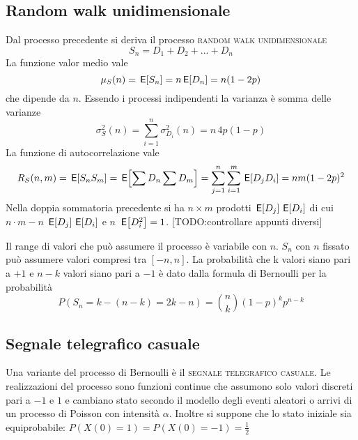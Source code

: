 \subsection{Random walk unidimensionale}
Dal processo precedente si deriva il processo \textsc{random walk unidimensionale}
\begin{equation}S_n=D_1+D_2+\dots+D_n\end{equation}
La funzione valor medio vale
\begin{equation}\mu_S(n)=\,{\operatorname{\mathsf{E}}}\!\left[{S_n}\right]=n\,{\operatorname{\mathsf{E}}}\!\left[{D_n}\right]=n(1-2p)\end{equation}
che dipende da $n$. Essendo i processi indipendenti la varianza è somma delle varianze
\begin{equation}\sigma^2_S(n)=\sum_{i=1}^{n}\sigma^2_{D_i}(n)=n\,4p(1-p)\end{equation}
La funzione di autocorrelazione vale
\begin{equation}R_S(n,m)=\,{\operatorname{\mathsf{E}}}\!\left[{S_n S_m}\right]=\,{\operatorname{\mathsf{E}}}\!\left[{\sum D_n \sum D_m}\right]=\sum_{j=1}^{n}\sum_{i=1}^{m}\,{\operatorname{\mathsf{E}}}\!\left[{D_j D_i}\right]=n m(1-2p)^2\end{equation}
Nella doppia sommatoria precedente si ha $n\times m$ prodotti $\,{\operatorname{\mathsf{E}}}\!\left[{D_j}\right]\,{\operatorname{\mathsf{E}}}\!\left[{D_i}\right]$ di cui $n\cdot m-n$ $\,{\operatorname{\mathsf{E}}}\!\left[{D_j}\right]\,{\operatorname{\mathsf{E}}}\!\left[{D_i}\right]$ e $n$ $\,{\operatorname{\mathsf{E}}}\!\left[{D^2_i}\right]=1$. [TODO:controllare appunti diversi]

Il range di valori che può assumere il processo è variabile con $n$. $S_n$ con $n$ fissato può assumere valori compresi tra $[-n,n]$. La probabilità che k valori siano pari a $+1$ e $n-k$ valori siano pari a $-1$ è dato dalla formula di Bernoulli per la probabilità 
\[P(S_n=k-(n-k)=2k-n)=\binom{n}{k}(1-p)^k p^{n-k}\]

\subsection{Segnale telegrafico casuale}
Una variante del processo di Bernoulli è il \textsc{segnale telegrafico casuale}. Le realizzazioni del processo sono funzioni continue che assumono solo valori discreti pari a $-1$ e $1$ e cambiano stato secondo il modello degli eventi aleatori o arrivi di un processo di Poisson con intensità $\alpha$. Inoltre si suppone che lo stato iniziale sia equiprobabile: $P(X(0)=1)=P(X(0)=-1)=\frac{1}{2}$

\begin{figure}[h!]
\centering{}
\end{figure}

